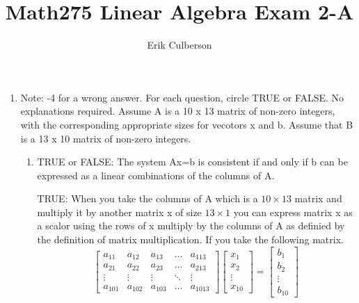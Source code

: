 \documentclass{article}
\begin{document}
\title{Math275 Linear Algebra Exam 2-A}
\author{Erik Culberson}

\maketitle

\begin{enumerate}
  \item Note: -4 for a wrong answer. For each question, circle TRUE or FALSE. No explanations required. Assume A is a 10 x 13 matrix of non-zero integers, with the corresponding appropriate sizes for vecotors x and b. Assume that B is a 13 x 10 matrix of non-zero integers.
    \begin{enumerate}
      \item TRUE or FALSE: The system Ax=b is consistent if and only if b can be expressed as a linear combinations of the columns of A.
        \vspace{0.5cm}
        \par
        TRUE: When you take the columns of A which is a $10 \times 13$ matrix and multiply it by another matrix x of size $13 \times 1$ you can express matrix x as a scalor using the rows of x multiply by the columns of A as definied by the definition of matrix multiplication. If you take the following matrix.
        \[
          \begin{bmatrix}
            a_{11} & a_{12} & a_{13} & \dots  & a_{113} \\
            a_{21} & a_{22} & a_{23} & \dots  & a_{213} \\
            \vdots & \vdots & \vdots & \ddots & \vdots \\
            a_{101} & a_{102} & a_{103} & \dots  & a_{1013}
          \end{bmatrix}
          \begin{bmatrix}
            x_{1} \\
            x_{2} \\
            \vdots \\
            x_{10}
          \end{bmatrix}
          =
          \begin{bmatrix}
            b_{1} \\
            b_{2} \\
            \vdots \\
            b_{10}
          \end{bmatrix}
        \]
        \par

\end{enumerate}
\end{enumerate}
\end{document}
